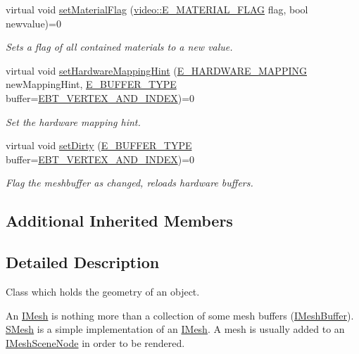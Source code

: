 \begin{DoxyCompactItemize}
virtual void \hyperlink{classirr_1_1scene_1_1IMesh_a56e034b671f52653d6c91e0ffa42febd}{set\+Material\+Flag} (\hyperlink{namespaceirr_1_1video_a8a3bc00ae8137535b9fbc5f40add70d3}{video\+::\+E\+\_\+\+M\+A\+T\+E\+R\+I\+A\+L\+\_\+\+F\+L\+AG} flag, bool newvalue)=0
\begin{DoxyCompactList}\small\item\em Sets a flag of all contained materials to a new value. \end{DoxyCompactList}\item 
virtual void \hyperlink{classirr_1_1scene_1_1IMesh_a1de908b8e67c28bdac546e8599043dfe}{set\+Hardware\+Mapping\+Hint} (\hyperlink{namespaceirr_1_1scene_ac7d8ee8d77da75f2580bb9bb17231c27}{E\+\_\+\+H\+A\+R\+D\+W\+A\+R\+E\+\_\+\+M\+A\+P\+P\+I\+NG} new\+Mapping\+Hint, \hyperlink{namespaceirr_1_1scene_a8f59a89ffef0ad8e5b2c2cb874a93e8c}{E\+\_\+\+B\+U\+F\+F\+E\+R\+\_\+\+T\+Y\+PE} buffer=\hyperlink{namespaceirr_1_1scene_a8f59a89ffef0ad8e5b2c2cb874a93e8ca833624730c30cffccc121fe31aa0832c}{E\+B\+T\+\_\+\+V\+E\+R\+T\+E\+X\+\_\+\+A\+N\+D\+\_\+\+I\+N\+D\+EX})=0
\begin{DoxyCompactList}\small\item\em Set the hardware mapping hint. \end{DoxyCompactList}\item 
virtual void \hyperlink{classirr_1_1scene_1_1IMesh_a496534cd4813d520d887785720f66c9b}{set\+Dirty} (\hyperlink{namespaceirr_1_1scene_a8f59a89ffef0ad8e5b2c2cb874a93e8c}{E\+\_\+\+B\+U\+F\+F\+E\+R\+\_\+\+T\+Y\+PE} buffer=\hyperlink{namespaceirr_1_1scene_a8f59a89ffef0ad8e5b2c2cb874a93e8ca833624730c30cffccc121fe31aa0832c}{E\+B\+T\+\_\+\+V\+E\+R\+T\+E\+X\+\_\+\+A\+N\+D\+\_\+\+I\+N\+D\+EX})=0
\begin{DoxyCompactList}\small\item\em Flag the meshbuffer as changed, reloads hardware buffers. \end{DoxyCompactList}\end{DoxyCompactItemize}
\subsection*{Additional Inherited Members}


\subsection{Detailed Description}
Class which holds the geometry of an object. 

An \hyperlink{classirr_1_1scene_1_1IMesh}{I\+Mesh} is nothing more than a collection of some mesh buffers (\hyperlink{classirr_1_1scene_1_1IMeshBuffer}{I\+Mesh\+Buffer}). \hyperlink{structirr_1_1scene_1_1SMesh}{S\+Mesh} is a simple implementation of an \hyperlink{classirr_1_1scene_1_1IMesh}{I\+Mesh}. A mesh is usually added to an \hyperlink{classirr_1_1scene_1_1IMeshSceneNode}{I\+Mesh\+Scene\+Node} in order to be rendered. 


